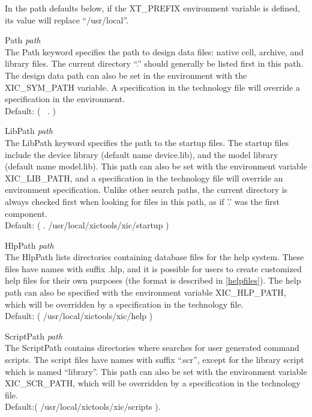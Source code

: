 In the path defaults below, if the {\et XT\_PREFIX} environment
variable is defined, its value will replace ``{\vt /usr/local}''.

\begin{description}
\item{\vt Path} {\it path}\\
The {\vt Path} keyword specifies the path to design data files: 
native cell, archive, and library files.  The current directory ``.''
should generally be listed first in this path.  The design data path can
also be set in the environment with the {\vt XIC\_SYM\_PATH} variable. 
A specification in the technology file will override a specification
in the environment.\\
Default:  {\vt ( ~.  )}

\item{\vt LibPath} {\it path}\\
The {\vt LibPath} keyword specifies the path to the startup files. 
The startup files include the device library (default name {\vt
device.lib}), and the model library (default name {\vt model.lib}). 
This path can also be set with the environment variable {\et
XIC\_LIB\_PATH}, and a specification in the technology file will
override an environment specification.  Unlike other search paths, the
current directory is always checked first when looking for files in
this path, as if '.' was the first component.\\
Default: {\vt ( .  /usr/local/xictools/xic/startup )}

\item{\vt HlpPath} {\it path}\\
The {\vt HlpPath} lists directories containing database files for the
help system.  These files have names with suffix {\vt .hlp}, and it is
possible for users to create customized help files for their own
purposes (the format is described in \ref{helpfiles}).  The help path
can also be specified with the environment variable {\et
XIC\_HLP\_PATH}, which will be overridden by a specification in the
technology file.\\
Default: {\vt ( /usr/local/xictools/xic/help )}

\item{\vt ScriptPath} {\it path}\\
The {\vt ScriptPath} contains directories where {\Xic} searches for
user generated command scripts.  The script files have names with
suffix ``{\vt .scr}'', except for the library script which is named
``{\vt library}''.  This path can also be set with the environment
variable {\et XIC\_SCR\_PATH}, which will be overridden by a
specification in the technology file.\\
Default:{\vt ( /usr/local/xictools/xic/scripts )}.
\end{description}

